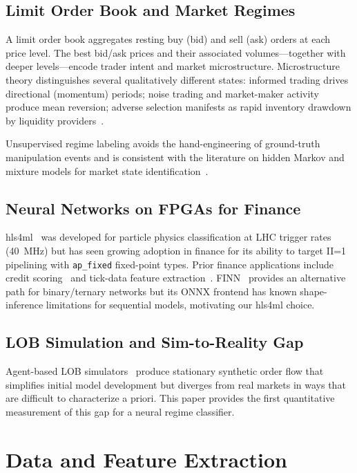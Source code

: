 \documentclass[conference]{IEEEtran}
\begin{document}
\subsection{Limit Order Book and Market Regimes}
A limit order book aggregates resting buy (bid) and sell (ask) orders at each
price level. The best bid/ask prices and their associated volumes—together with
deeper levels—encode trader intent and market microstructure. Microstructure
theory distinguishes several qualitatively different states: informed trading
drives directional (momentum) periods; noise trading and market-maker activity
produce mean reversion; adverse selection manifests as rapid inventory drawdown
by liquidity providers~\cite{glosten1985bid}.

Unsupervised regime labeling avoids the hand-engineering of ground-truth
manipulation events and is consistent with the literature on hidden Markov and
mixture models for market state identification~\cite{hamilton1989new}.

\subsection{Neural Networks on FPGAs for Finance}
hls4ml~\cite{duarte2018fast} was developed for particle physics classification
at LHC trigger rates (40~MHz) but has seen growing adoption in finance for its
ability to target II=1 pipelining with \texttt{ap\_fixed} fixed-point types.
Prior finance applications include credit scoring~\cite{omondiagbe2023hls4ml}
and tick-data feature extraction~\cite{eskandari2020fpga}.
FINN~\cite{umuroglu2017finn} provides an alternative path for binary/ternary
networks but its ONNX frontend has known shape-inference limitations for
sequential models, motivating our hls4ml choice.

\subsection{LOB Simulation and Sim-to-Reality Gap}
Agent-based LOB simulators~\cite{byrd2019abides} produce stationary synthetic
order flow that simplifies initial model development but diverges from real
markets in ways that are difficult to characterize a priori. This paper provides
the first quantitative measurement of this gap for a neural regime classifier.


\section{Data and Feature Extraction}
\label{sec:method}
\end{document}
